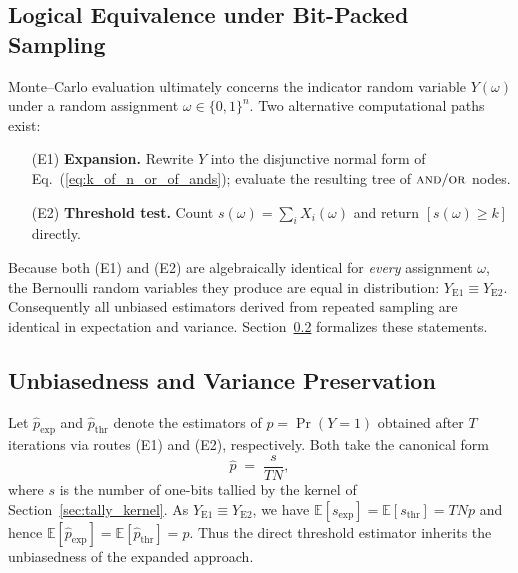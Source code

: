 \subsection{Logical Equivalence under Bit-Packed Sampling}
\label{sec:voter_equivalence}

Monte–Carlo evaluation ultimately concerns the indicator random variable
$Y(\omega)$ under a random assignment $\omega\in\{0,1\}^{n}$.  Two alternative
computational paths exist:
\begin{enumerate}
  \item[(E1)] \textbf{Expansion.}  Rewrite $Y$ into the disjunctive normal form
        of Eq.~(\ref{eq:k_of_n_or_of_ands}); evaluate the resulting tree of
        $\textsc{and}/\textsc{or}$ nodes.
  \item[(E2)] \textbf{Threshold test.}  Count $s(\omega)=\sum_i X_i(\omega)$
        and return $[s(\omega)\ge k]$ directly.
\end{enumerate}
Because both (E1) and (E2) are algebraically identical for \emph{every}
assignment $\omega$, the Bernoulli random variables they produce are equal in
distribution:
\(
  Y_{\mathrm{E1}}\equiv Y_{\mathrm{E2}}.
\)
Consequently all unbiased estimators derived from repeated sampling are
identical in expectation and variance.  Section~\ref{sec:voter_unbiased_variance} formalizes these statements.

\subsection{Unbiasedness and Variance Preservation}
\label{sec:voter_unbiased_variance}

Let $\widehat{p}_\text{exp}$ and $\widehat{p}_\text{thr}$ denote the
estimators of $p=\Pr(Y=1)$ obtained after $T$ iterations via routes (E1) and
(E2), respectively.  Both take the canonical form
\[
  \widehat{p}\;=\;\frac{s}{T N},
\]
where $s$ is the number of one-bits tallied by the kernel of
Section~\ref{sec:tally_kernel}.  As $Y_{\mathrm{E1}}\equiv Y_{\mathrm{E2}}$, we
have $\mathbb{E}[s_{\mathrm{exp}}]=\mathbb{E}[s_{\mathrm{thr}}]=T N p$ and hence
\(
  \mathbb{E}[\widehat{p}_\text{exp}] =\mathbb{E}[\widehat{p}_\text{thr}] = p.
\)
Thus the direct threshold estimator inherits the unbiasedness of the expanded
approach.


